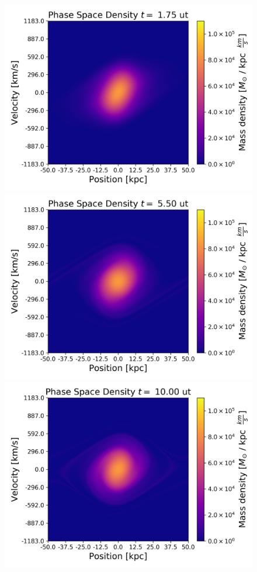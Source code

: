 \begin{figure}[h!]
    \centering
    \includegraphics[scale=0.45]{imag/phase7.png}
    \includegraphics[scale=0.45]{imag/phase22.png}
    \includegraphics[scale=0.45]{imag/phase40.png}

\end{figure}
